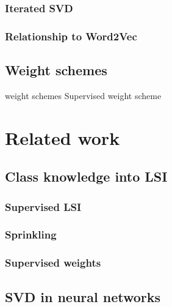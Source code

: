         \subsection{Iterated SVD}
            \cite{brand2006fast} %
        \subsection{Relationship to Word2Vec}
            \cite{naili2017comparative} %
            \cite{levy2014neural} %
            \cite{altszyler2016comparative} %
            \cite{levy2015improving} %


    \section{Weight schemes}
        \cite{wu2017balancing} %
            weight schemes
            Supervised weight scheme



\chapter{Related work}
    \section{Class knowledge into LSI}
        \subsection{Supervised LSI}
            \cite{sun2004supervised} %

        \subsection{Sprinkling}
            \cite{chakraborti2007supervised} %
        
        \subsection{Supervised weights}
            \cite{ji2013discriminative} %
            \cite{deng2014study} %
            \cite{lan2009supervised} %

    
    \section{SVD in neural networks}
